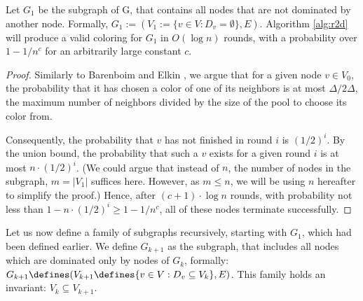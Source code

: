 \begin{lemma}
\label{theorem:r2dzeit}
	Let $G_1$ be the subgraph of G, that contains all nodes that are not dominated by another node. Formally, $G_1 := (V_1 := \{v \in V : D_v = \emptyset \}, E)$. Algorithm \ref{alg:r2d} will produce a valid coloring for $G_1$ in $O(\log n)$ rounds, with a probability over $1-1/n^c$ for an arbitrarily large constant $c$.
\end{lemma}
\begin{proof}
	Similarly to Barenboim and Elkin \cite[p. 102]{be-dcg-13}, we argue that for a given node $v \in V_0$, the probability that it has chosen a color of one of its neighbors is at most $\Delta / 2\Delta$, the maximum number of neighbors divided by the size of the pool to choose its color from.
	
	Consequently, the probability that $v$ has not finished in round $i$ is $(1/2)^i$. By the union bound, the probability that such a $v$ exists for a given round $i$ is at most $n \cdot (1/2)^i$. (We could argue that instead of $n$, the number of nodes in the subgraph, $m = |V_1|$ suffices here.  However, as $m \leq n$, we will be using $n$ hereafter to simplify the proof.)  Hence, after $(c+1) \cdot \log n$ rounds, with probability not less than $1-n \cdot (1/2)^i \geq 1-1/n^c$, all of these nodes terminate successfully.
\end{proof}

Let us now define a family of subgraphs recursively, starting with $G_1$, which had been defined earlier. We define $G_{k+1}$ as the subgraph, that includes all nodes which are dominated only by nodes of $G_k$, formally: $G_{k+1} \defines (V_{k+1} \defines \{v \in V : D_v \subseteq V_k\}, E)$. This family holds an invariant: $V_k \subseteq V_{k+1}$.

